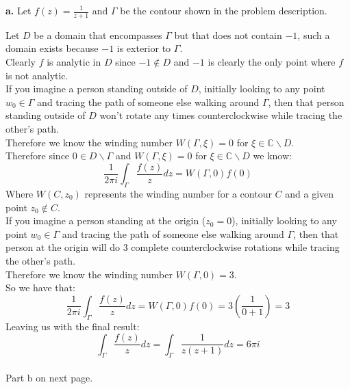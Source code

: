 \documentclass{article}
\begin{document}
{\Large\textbf{a.}} Let $f(z) =\frac{1}{z+1}$ and $\Gamma$ be the contour shown in the problem description.
\begin{center}
    \doublespacing
    Let $D$ be a domain that encompasses $\Gamma$ but that does not contain $-1$, such a domain exists because $-1$ is exterior to $\Gamma$.
    \\Clearly $f$ is analytic in $D$ since $-1\notin D$ and $-1$ is clearly the only point where $f$ is not analytic.
    \\If you imagine a person standing outside of $D$, initially looking to any point $w_0\in\Gamma$ and tracing the path of someone else walking around $\Gamma$, then that person standing outside of $D$ won't rotate any times counterclockwise while tracing the other's path.
    \\Therefore we know the winding number $W(\Gamma,\xi) = 0$ for $\xi\in\mathbb{C}\backslash D$.
    \\Therefore since $0\in D\backslash\Gamma$ and $W(\Gamma,\xi) = 0$ for $\xi\in\mathbb{C}\backslash D$ we know:
    \[\frac{1}{2\pi i}\int _{\Gamma}\frac{f(z)}{z} dz = W(\Gamma, 0) f(0)\]
    Where $W(C, z_0)$ represents the winding number for a contour $C$ and a given point $z_0\notin C$.
    \\If you imagine a person standing at the origin ($z_0 = 0$), initially looking to any point $w_0\in\Gamma$ and tracing the path of someone else walking around $\Gamma$, then that person at the origin will do 3 complete counterclockwise rotations while tracing the other's path.
    \\Therefore we know the winding number $W(\Gamma, 0) = 3$.
    \\So we have that:
    \[\frac{1}{2\pi i}\int _{\Gamma}\frac{f(z)}{z} dz = W(\Gamma, 0) f(0) = 3(\frac{1}{0+1}) = 3\]
    Leaving us with the final result:
    \[\int _{\Gamma}\frac{f(z)}{z} dz =\int _{\Gamma}\frac{1}{z(z+1)} dz = 6\pi i\]
    \qedsymbol
    \break
    \\Part b on next page.
\end{center}
\end{document}
